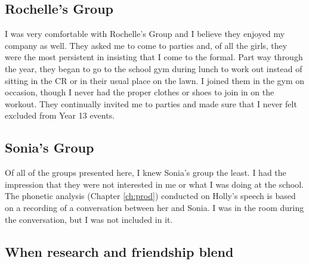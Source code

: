 \subsection{Rochelle's Group}
I was very comfortable with Rochelle's Group and I believe they enjoyed my company as well. They asked me to come to parties and, of all the girls, they were the most persistent in insisting that I come to the formal. Part way through the year, they began to go to the school gym during lunch to work out instead of sitting in the CR or in their usual place on the lawn. I joined them in the gym on occasion, though I never had the proper clothes or shoes to join in on the workout. They continually invited me to parties and made sure that I never felt excluded from Year 13 events.

\subsection{Sonia's Group}
Of all of the groups presented here, I knew Sonia's group the least. I had the impression that they were not interested in me or what I was doing at the school. The phonetic analysis (Chapter \ref{ch:prod}) conducted on Holly's speech is based on a recording of a conversation between her and Sonia. I was in the room during the conversation, but I was not included in it. 




\subsection{When research and friendship blend}

